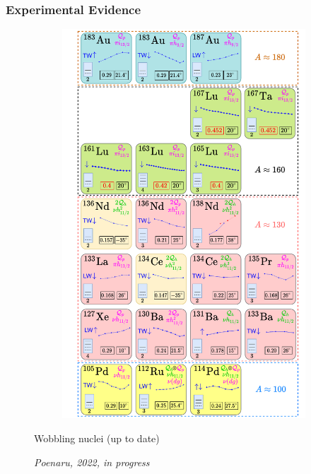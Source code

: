 \documentclass{beamer}
\begin{document}
\begin{frame}
  \frametitle{Experimental Evidence}
  \begin{figure}
    \centering
    \begin{minipage}{.5\textwidth}
      \begin{figure}
        \centering
        \includegraphics[scale=0.22]{Figs/wobblers-chart.pdf}
      \end{figure}
    \end{minipage}%
    \begin{minipage}{.5\textwidth}
      \par Wobbling nuclei (up to date)
      \par \textit{Poenaru, 2022, in progress}
    \end{minipage}
    \end{figure}
\end{frame}

\end{document}

